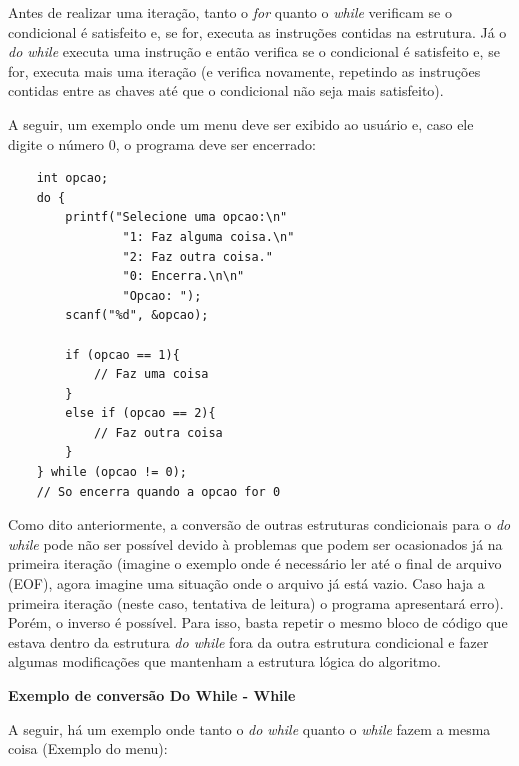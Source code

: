 \documentclass[12pt]{article}
\newcommand\tab[1][1cm]{\hspace*{#1}}
\begin{document}
\hspace{0.25cm}
\begin{tcolorbox}[colback=green!5!white,colframe=green!75!black,title=Curiosidade]
  \par\tab Antes de realizar uma iteração, tanto o \textit{for} quanto o \textit{while} verificam se o condicional é satisfeito e, se for, executa as instruções contidas na estrutura. Já o \textit{do while} executa uma instrução e então verifica se o condicional é satisfeito e, se for, executa mais uma iteração (e verifica novamente, repetindo as instruções contidas entre as chaves até que o condicional não seja mais satisfeito).
\end{tcolorbox}

\par\tab A seguir, um exemplo onde um menu deve ser exibido ao usuário e, caso ele digite o número 0, o programa deve ser encerrado:

\hspace{0.25cm}
\begin{lstlisting}
    int opcao;
    do {
        printf("Selecione uma opcao:\n"
                "1: Faz alguma coisa.\n"
                "2: Faz outra coisa."
                "0: Encerra.\n\n"
                "Opcao: ");
        scanf("%d", &opcao);
        
        if (opcao == 1){
            // Faz uma coisa
        }
        else if (opcao == 2){
            // Faz outra coisa
        }
    } while (opcao != 0);
    // So encerra quando a opcao for 0
\end{lstlisting}

\par\tab Como dito anteriormente, a conversão de outras estruturas condicionais para o \textit{do while} pode não ser possível devido à problemas que podem ser ocasionados já na primeira iteração (imagine o exemplo onde é necessário ler até o final de arquivo (EOF), agora imagine uma situação onde o arquivo já está vazio. Caso haja a primeira iteração (neste caso, tentativa de leitura) o programa apresentará erro). Porém, o inverso é possível. Para isso, basta repetir o mesmo bloco de código que estava dentro da estrutura \textit{do while} fora da outra estrutura condicional e fazer algumas modificações que mantenham a estrutura lógica do algoritmo.

\hspace{0.25cm}
\par\tab\textbf{Exemplo de conversão Do While - While}

\par\tab A seguir, há um exemplo onde tanto o \textit{do while} quanto o \textit{while} fazem a mesma coisa (Exemplo do menu):
\end{document}
